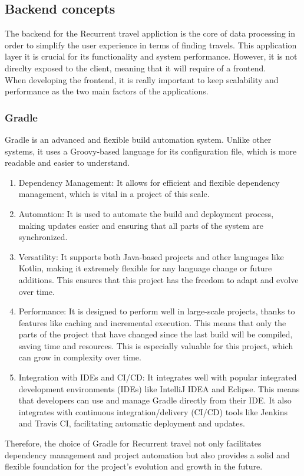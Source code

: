\documentclass[../memory.tex]{subfiles}
\begin{document}
\subsection{Backend concepts}
The backend for the Recurrent travel appliction is the core of data processing
in order to simplify the user experience in terms of finding travels. This
application layer it is crucial for its functionality and system performance.
However, it is not direclty exposed to the client, meaning that it will require
of a frontend.
\\
When developing the frontend, it is really important to keep scalability and
performance as the two main factors of the applications.
\subsubsection{Gradle}
Gradle is an advanced and flexible build automation system. Unlike other
systems, it uses a Groovy-based language for its configuration file, which is
more readable and easier to understand.
\begin{enumerate}[label = -]
	\item Dependency Management: It allows for efficient and flexible dependency
	      management, which is vital in a project of this scale.
	\item Automation: It is used to automate the build and deployment process,
	      making updates easier and ensuring that all parts of the system are
	      synchronized.
	\item Versatility: It supports both Java-based projects and other languages
	      like Kotlin, making it extremely flexible for any language change or future
	      additions. This ensures that this project has the freedom to adapt and
	      evolve over time.
	\item Performance: It is designed to perform well in large-scale projects,
	      thanks to features like caching and incremental execution. This means that
	      only the parts of the project that have changed since the last build will be
	      compiled, saving time and resources. This is especially valuable for this
	      project, which can grow in complexity over time.
	\item Integration with IDEs and CI/CD: It integrates well with popular
	      integrated development environments (IDEs) like IntelliJ IDEA and Eclipse.
	      This means that developers can use and manage Gradle directly from their IDE.
	      It also integrates with continuous integration/delivery (CI/CD) tools like
	      Jenkins and Travis CI, facilitating automatic deployment and updates.
\end{enumerate}
Therefore, the choice of Gradle for Recurrent travel not only facilitates
dependency management and project automation but also provides a solid and
flexible foundation for the project's evolution and growth in the future.
\end{document}
